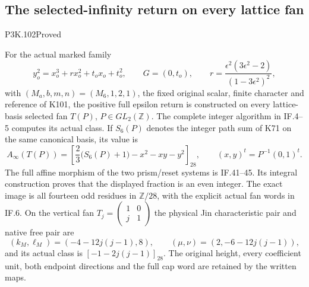 \subsection{The selected-infinity return on every lattice fan}
\begin{statement}{P3K.102}{Proved}

For the actual marked family
\[
 y_o^2=x_o^3+r x_o^2+t_o x_o+t_o^2,\qquad G=(0,t_o),\qquad
 r=\frac{\epsilon^2(3\epsilon^2-2)}{(1-3\epsilon^2)^2},
\]
with \((M_a,b,m,n)=(M_6,1,2,1)\), the fixed original scalar,
finite character and reference of K101, the positive full epsilon
return is constructed on every lattice-basis selected fan \(T(P)\),
\(P\in GL_2(\mathbb Z)\).  The complete integer algorithm in
IF.4--5 computes its actual class.  If \(S_6(P)\) denotes the
integer path sum of K71 on the same canonical basis, its value is
\[
 A_\infty(T(P))=
 \left[\frac23\bigl(S_6(P)+1\bigr)-x^2-xy-y^2\right]_{28},
 \qquad (x,y)^t=P^{-1}(0,1)^t.
\]
The full affine morphism of the two prism/reset systems is IF.41--45.
Its integral construction proves that the displayed fraction is an
even integer.  The exact image is all fourteen odd residues in
\(\mathbb Z/28\), with the explicit actual fan words in IF.6.
On the vertical fan
\(T_j=\left(\begin{smallmatrix}1&0\\j&1\end{smallmatrix}\right)\)
the physical Jin characteristic pair and native free pair are
\[
 (k_M,\ell_M)=(-4-12j(j-1),8),\qquad
 (\mu,\nu)=(2,-6-12j(j-1)),
\]
and its actual class is \([-1-2j(j-1)]_{28}\).  The original
height, every coefficient unit, both endpoint directions and the
full cap word are retained by the written maps.

\end{statement}
